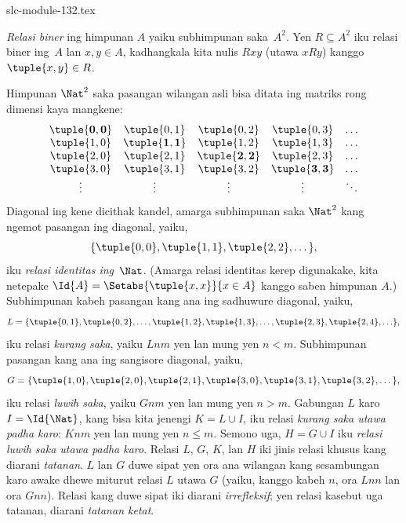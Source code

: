 \begin{filecontents*}[overwrite]{slc-module-132.tex}
\begin{defn}
\emph{Relasi biner} ing himpunan $A$ yaiku subhimpunan
saka~$A^{2}$. Yen $R\subseteq A^{2}$ iku relasi biner
ing~$A$ lan $x, y \in A$, kadhangkala kita nulis
$Rxy$ (utawa $xRy$) kanggo $\tuple{x, y} \in R$.
\end{defn}

\begin{ex}
Himpunan $\Nat^{2}$ saka pasangan wilangan asli bisa
ditata ing matriks rong dimensi kaya mangkene:
\[
  \begin{array}{ccccc}
  \mathbf{\tuple{ 0,0 }} & \tuple{ 0,1 } &
    \tuple{ 0,2 } & \tuple{ 0,3 } & \ldots\\
  \tuple{ 1,0 } & \mathbf{\tuple{ 1,1 }} &
    \tuple{ 1,2 } & \tuple{ 1,3 } & \ldots\\
  \tuple{ 2,0 } & \tuple{ 2,1 } &
    \mathbf{\tuple{ 2,2 }} & \tuple{ 2,3 } & \ldots\\
  \tuple{ 3,0 } & \tuple{ 3,1 } & \tuple{ 3,2 } &
    \mathbf{\tuple{ 3,3 }} & \ldots\\
  \vdots & \vdots & \vdots & \vdots & \mathbf{\ddots}
  \end{array}
\]
Diagonal ing kene dicithak kandel, amarga subhimpunan saka
$\Nat^2$ kang ngemot pasangan ing diagonal, yaiku,
\[
  \{\tuple{0,0 }, \tuple{ 1,1 }, \tuple{ 2,2 }, \dots\},
  \]
iku \emph{relasi identitas ing}~$\Nat$.
(Amarga relasi identitas kerep digunakake, kita netepake
$\Id{A}=\Setabs{\tuple{ x,x }}{x \in A}$ kanggo saben himpunan $A$.)
Subhimpunan kabeh pasangan kang ana ing sadhuwure diagonal, yaiku,
\[
  L = \{\tuple{ 0,1 },\tuple{ 0,2 },\ldots,\tuple{ 1,2 },
  \tuple{ 1,3 }, \dots, \tuple{ 2,3 }, \tuple{ 2,4 },\ldots\},
\]
iku relasi \emph{kurang saka}, yaiku $Lnm$ yen lan mung yen $n<m$.
Subhimpunan pasangan kang ana ing sangisore diagonal, yaiku,
\[
  G=\{ \tuple{ 1,0 },\tuple{ 2,0 },\tuple{
    2,1 }, \tuple{ 3,0 },\tuple{ 3,1 },\tuple{ 3,2 }, \dots\},
\]
iku relasi \emph{luwih saka}, yaiku $Gnm$ yen lan mung yen $n>m$.
Gabungan $L$ karo $I=\Id{\Nat}$, kang bisa kita jenengi $K=L\cup I$,
iku relasi \emph{kurang saka utawa padha karo}:
$Knm$ yen lan mung yen $n \le m$.
Semono uga, $H=G \cup I$ iku \emph{relasi luwih saka
utawa padha karo}. Relasi $L$, $G$, $K$, lan $H$ iki
jinis relasi khusus kang diarani \emph{tatanan}.
$L$ lan $G$ duwe sipat yen ora ana wilangan kang sesambungan
karo awake dhewe miturut relasi $L$ utawa $G$
(yaiku, kanggo kabeh $n$, ora $Lnn$ lan ora $Gnn$).
Relasi kang duwe sipat iki diarani \emph{irrefleksif};
yen relasi kasebut uga tatanan, diarani \emph{tatanan ketat}.
\end{ex}


\end{filecontents*}
